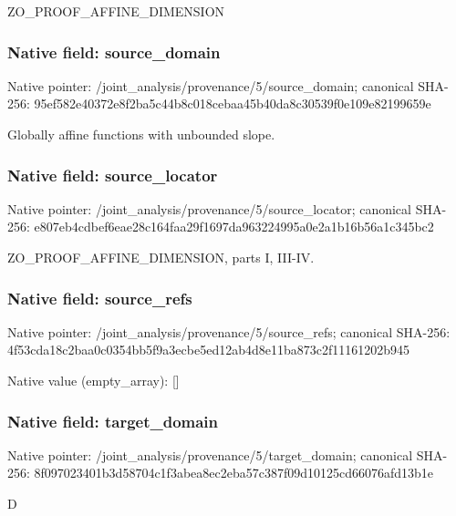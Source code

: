 \documentclass[10pt,a4paper]{article}
\begin{document}
\begingroup\raggedright\sloppy ZO\_\allowbreak{}PROOF\_\allowbreak{}AFFINE\_\allowbreak{}DIMENSION\par\endgroup

\subsubsection{Native field: source\_\allowbreak{}domain}
Native pointer: /joint\_\allowbreak{}analysis/provenance/5/source\_\allowbreak{}domain; canonical SHA-256: 95ef582e40372e8f2ba5c44b8c018cebaa45b40da8c30539f0e109e82199659e

\begingroup\raggedright\sloppy Globally affine functions with unbounded slope.\par\endgroup

\subsubsection{Native field: source\_\allowbreak{}locator}
Native pointer: /joint\_\allowbreak{}analysis/provenance/5/source\_\allowbreak{}locator; canonical SHA-256: e807eb4cdbef6eae28c164faa29f1697da963224995a0e2a1b16b56a1c345bc2

\begingroup\raggedright\sloppy ZO\_\allowbreak{}PROOF\_\allowbreak{}AFFINE\_\allowbreak{}DIMENSION,\allowbreak{} parts I,\allowbreak{} III-IV.\par\endgroup

\subsubsection{Native field: source\_\allowbreak{}refs}
Native pointer: /joint\_\allowbreak{}analysis/provenance/5/source\_\allowbreak{}refs; canonical SHA-256: 4f53cda18c2baa0c0354bb5f9a3ecbe5ed12ab4d8e11ba873c2f11161202b945

Native value (empty\_\allowbreak{}array): []

\subsubsection{Native field: target\_\allowbreak{}domain}
Native pointer: /joint\_\allowbreak{}analysis/provenance/5/target\_\allowbreak{}domain; canonical SHA-256: 8f097023401b3d58704c1f3abea8ec2eba57c387f09d10125cd66076afd13b1e

\begingroup\raggedright\sloppy D\par\endgroup
\end{document}
